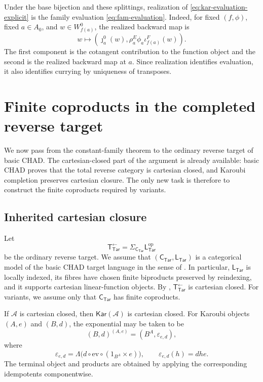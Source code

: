 \documentclass[runningheads,envcountsame]{llncs}
\newcommand{\Tar}{\mathsf{Tar}}
\newcommand{\CTar}{\mathsf C_{\Tar}}
\newcommand{\LTar}{\mathsf L_{\Tar}}
\newcommand{\TotTar}{\mathsf T_{\Tar}^{\leftarrow}}
\newcommand{\Kar}{\mathsf{Kar}}
\begin{document}
Under the base bijection and these splittings, realization of
\eqref{eq:kar-evaluation-explicit} is the family evaluation
\eqref{eq:fam-evaluation}. Indeed, for fixed $(f,\phi)$, fixed $a\in A_0$,
and $w\in W_{f(a)}^0$, the realized backward map is
$$
w\longmapsto
\left(
 \jmath_a^0(w),
 \rho_a^E\phi_a\iota_{f(a)}^F(w)
\right).
$$
The first component is the cotangent contribution to the function object and
the second is the realized backward map at $a$. Since realization identifies
evaluation, it also identifies currying by uniqueness of transposes.





\section{Finite coproducts in the completed reverse target}
\label{app:target-closure}

We now pass from the constant-family theorem to the ordinary reverse target of
basic CHAD\@. The cartesian-closed part of the argument is already available:
basic CHAD proves that the total reverse category is cartesian closed, and
Karoubi completion preserves cartesian closure. The only new task is therefore
to construct the finite coproducts required by variants.

\subsection{Inherited cartesian closure}

Let
$$
\TotTar=\Sigma_{\CTar}\LTar^{\mathrm{op}}
$$
be the ordinary reverse target. We assume that $(\CTar,\LTar)$ is a
categorical model of the basic CHAD target language in the sense of
\cite[Definition~5.5]{VakarSmeding2022}. In particular, $\LTar$ is locally
indexed, its fibres have chosen finite biproducts preserved by reindexing, and
it supports cartesian linear-function objects. By
\cite[Theorem~6.2]{VakarSmeding2022}, $\TotTar$ is cartesian closed. For
variants, we assume only that $\CTar$ has finite coproducts.

\begin{proposition}
\label{prop:kar-ccc-app}
If $\mathcal A$ is cartesian closed, then $\Kar(\mathcal A)$ is
cartesian closed. For Karoubi objects $(A,e)$ and $(B,d)$, the exponential may
be taken to be
$$
(B,d)^{(A,e)}=(B^A,\varepsilon_{e,d}),
$$
where
$$
\varepsilon_{e,d}
=
\Lambda\bigl(d\circ\mathrm{ev}\circ(1_{B^A}\times e)\bigr),
\qquad
\varepsilon_{e,d}(h)=dhe.
$$
The terminal object and products are obtained by applying the corresponding
idempotents componentwise.
\end{proposition}
\end{document}

